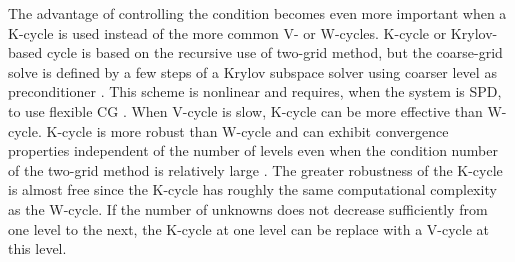 The advantage of controlling the condition becomes even more important when a
K-cycle is used instead of the more common V- or W-cycles. K-cycle or
Krylov-based cycle is based on the recursive use of two-grid method,
but the coarse-grid solve is defined by a few steps of a Krylov subspace
solver using coarser level as preconditioner \cite{k_cycle}. This scheme is 
nonlinear and requires, when the system is SPD, to use flexible CG 
\cite{fcg,fcg_2,fcg_3,fcg_4}. When V-cycle is slow, K-cycle can be more
effective than W-cycle. K-cycle is more robust than W-cycle and can exhibit
convergence properties independent of the number of levels even when the
condition number of the two-grid method is relatively large \cite{k_cycle}.
The greater robustness of the K-cycle is almost free since the K-cycle has
roughly the same computational complexity as the W-cycle. If the number of
unknowns does not decrease sufficiently from one level to the next, the
K-cycle at one level can be replace with a V-cycle at this level.
